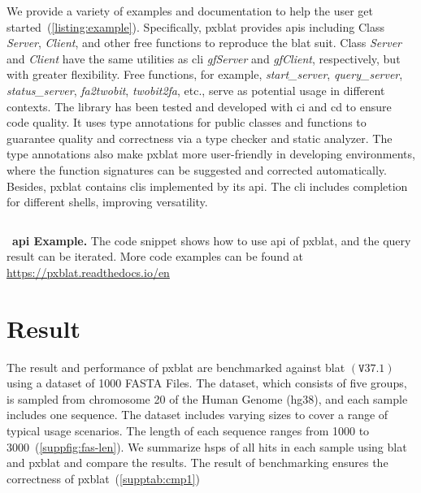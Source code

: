 \documentclass[unnumsec,webpdf,contemporary,large]{oup-authoring-template}%
\theoremstyle{thmstyleone}%
\theoremstyle{thmstyletwo}%
\theoremstyle{thmstylethree}%
\newcommand{\mycaption}[2]{\caption[#1]{\textbar\, \textbf{#1.} #2}}
\newcommand\pCref[1]{(\ref{#1})}
\begin{document}
We provide a variety of examples and documentation to help the user get started~\pCref{listing:example}.
Specifically, \gls{pxblat} provides \glspl{api} including Class \emph{Server}, \emph{Client}, and other free functions to reproduce the \gls{blat} suit.
Class \emph{Server} and \emph{Client} have the same utilities as \gls{cli} \emph{gfServer} and \emph{gfClient}, respectively, but with greater flexibility.
Free functions, for example, \emph{start\_server}, \emph{query\_server}, \emph{status\_server}, \emph{fa2twobit}, \emph{twobit2fa}, etc., serve as potential usage in different contexts.
The library has been tested and developed with \gls{ci} and \gls{cd} to ensure code quality.
It uses type annotations for public classes and functions to guarantee quality and correctness via a type checker and static analyzer.
The type annotations also make \gls{pxblat} more user-friendly in developing environments, where the function signatures can be suggested and corrected automatically.
Besides, \gls{pxblat} contains \glspl{cli} implemented by its \gls{api}.
The \gls{cli} includes completion for different shells, improving versatility.

\begin{listing}
	\inputminted[linenos, breaklines]{python}{codes/example1.py}
	\mycaption{\gls{api} Example}{The code snippet shows how to use \gls{api} of \gls{pxblat},
		and the query result can be iterated. More code examples can be found at \url{https://pxblat.readthedocs.io/en}}
	\label{listing:example}
\end{listing}



\section{Result}\label{sec:result}

The result and performance of \gls{pxblat} are benchmarked against \gls{blat} \(\left(\mathtt{V}37.1\right)\) using a dataset of \num[round-mode=places, round-precision=0]{1000} FASTA Files.
The dataset, which consists of five groups, is sampled from chromosome \num[round-mode=places, round-precision=0]{20} of the Human Genome (hg38), and each sample includes one sequence.
The dataset includes varying sizes to cover a range of typical usage scenarios.
The length of each sequence ranges from \num[round-mode=places, round-precision=0]{1000} to \num[round-mode=places, round-precision=0]{3000}~\pCref{suppfig:fas-len}.
We summarize \glspl{hsp} of all hits in each sample using \gls{blat} and \gls{pxblat} and compare the results.
The result of benchmarking ensures the correctness of \gls{pxblat}~\pCref{supptab:cmp1}
\end{document}
